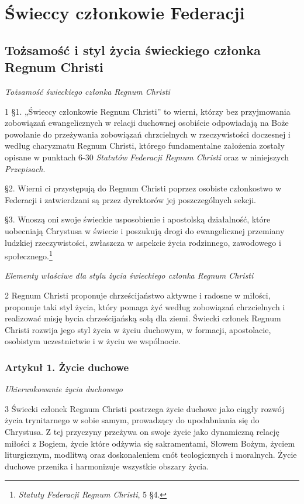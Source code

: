 ﻿\documentclass{report}
\newcommand{\lett}[1]{\lettrine[findent=6pt]{#1}{}}
\newcommand{\ssec}[1]{\vspace{1em}\textit{#1}\vspace{.5em}\nopagebreak}
\begin{document}
\part{Świeccy członkowie Federacji}


\chapter{Tożsamość i styl życia świeckiego członka Regnum Christi}
 
\ssec{Tożsamość świeckiego członka Regnum Christi}
 
\lett{1} \S{}1. „Świeccy członkowie Regnum Christi” to wierni, którzy bez przyjmowania zobowiązań ewangelicznych w relacji duchownej osobiście odpowiadają na Boże powołanie do przeżywania zobowiązań chrzcielnych w rzeczywistości doczesnej i według charyzmatu  Regnum Christi, którego fundamentalne założenia zostały opisane w punktach  6-30 {\em Statutów Federacji Regnum Christi} oraz w niniejszych {\em Przepisach}.


\S{}2. Wierni ci przystępują do Regnum Christi poprzez osobiste członkostwo w Federacji i zatwierdzani są przez dyrektorów jej poszczególnych sekcji.


\S{}3. Wnoszą oni swoje świeckie usposobienie i apostolską działalność, które uobecniają Chrystusa w świecie i poszukują drogi do ewangelicznej przemiany ludzkiej rzeczywistości, zwłaszcza w aspekcie życia rodzinnego, zawodowego i społecznego.\footnote{{\em Statuty Federacji Regnum Christi}, 5 \S{}4.}
 
\ssec{Elementy właściwe dla stylu życia świeckiego członka Regnum Christi}
 
\lett{2} Regnum Christi proponuje chrześcijaństwo aktywne i radosne w miłości, proponuje taki styl życia, który pomaga żyć według zobowiązań chrzcielnych i realizować misję bycia chrześcijańską solą dla ziemi. Świecki członek Regnum Christi rozwija jego styl życia w życiu duchowym, w formacji, apostolacie, osobistym uczestnictwie i w życiu we wspólnocie.


\section{Artykuł 1. Życie duchowe}


\ssec{Ukierunkowanie życia duchowego}


\lett{3} Świecki członek Regnum Christi postrzega życie duchowe jako ciągły rozwój życia trynitarnego w sobie samym, prowadzący do upodabniania się do Chrystusa. Z tej przyczyny przeżywa on swoje życie jako dynamiczną relację miłości z Bogiem, życie które odżywia się sakramentami, Słowem Bożym, życiem liturgicznym, modlitwą oraz doskonaleniem cnót teologicznych i moralnych. Życie duchowe przenika i harmonizuje wszystkie obszary życia.
\end{document}
